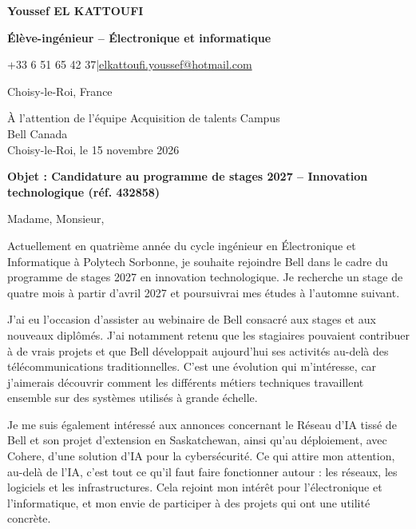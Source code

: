 \documentclass[10pt,a4paper]{article}
\begin{document}
{
{\fontsize{15.4}{17.2}\selectfont\bfseries\color{bleu}Youssef EL KATTOUFI}\par\vspace{1pt}
{\fontsize{10.1}{11.4}\selectfont\bfseries\color{rouge}Élève-ingénieur -- Électronique et informatique}\par\vspace{1pt}
{\fontsize{9.9}{11.1}\selectfont +33 6 51 65 42 37\quad\textcolor{gris}{|}\quad \href{mailto:elkattoufi.youssef@hotmail.com}{elkattoufi.youssef@hotmail.com}}\par
{\fontsize{9.9}{11.1}\selectfont Choisy-le-Roi, France}\par}
\vspace{20pt}

{\fontsize{9.35}{10.5}\selectfont\raggedleft
À l'attention de l'équipe Acquisition de talents Campus\\
Bell Canada\\[3pt]
Choisy-le-Roi, le 15 novembre 2026\par}
\vspace{14pt}
{\fontsize{10}{11.5}\selectfont\bfseries\color{bleu}Objet : Candidature au programme de stages 2027 -- Innovation technologique (réf. 432858)\par}
\vspace{4pt}

\fontsize{10.7}{12.35}\selectfont
Madame, Monsieur,

\justifying
Actuellement en quatrième année du cycle ingénieur en Électronique et Informatique à Polytech Sorbonne, je souhaite rejoindre Bell dans le cadre du programme de stages 2027 en innovation technologique. Je recherche un stage de quatre mois à partir d'avril 2027 et poursuivrai mes études à l'automne suivant.

J'ai eu l'occasion d'assister au webinaire de Bell consacré aux stages et aux nouveaux diplômés. J'ai notamment retenu que les stagiaires pouvaient contribuer à de vrais projets et que Bell développait aujourd'hui ses activités au-delà des télécommunications traditionnelles. C'est une évolution qui m'intéresse, car j'aimerais découvrir comment les différents métiers techniques travaillent ensemble sur des systèmes utilisés à grande échelle.

Je me suis également intéressé aux annonces concernant le Réseau d'IA tissé de Bell et son projet d'extension en Saskatchewan, ainsi qu'au déploiement, avec Cohere, d'une solution d'IA pour la cybersécurité. Ce qui attire mon attention, au-delà de l'IA, c'est tout ce qu'il faut faire fonctionner autour : les réseaux, les logiciels et les infrastructures. Cela rejoint mon intérêt pour l'électronique et l'informatique, et mon envie de participer à des projets qui ont une utilité concrète.
\end{document}
